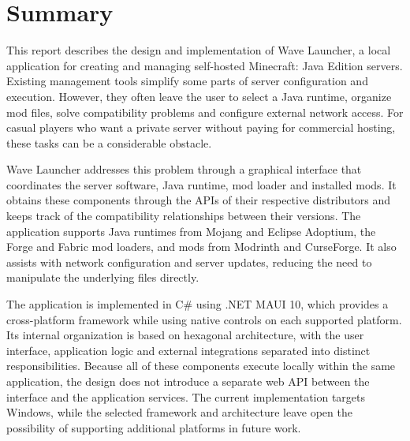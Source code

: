 
\chapter{Summary}

This report describes the design and implementation of Wave Launcher, a local application for creating and managing self-hosted Minecraft: Java Edition servers. Existing management tools simplify some parts of server configuration and execution. However, they often leave the user to select a Java runtime, organize mod files, solve compatibility problems and configure external network access. For casual players who want a private server without paying for commercial hosting, these tasks can be a considerable obstacle.

Wave Launcher addresses this problem through a graphical interface that coordinates the server software, Java runtime, mod loader and installed mods. It obtains these components through the APIs of their respective distributors and keeps track of the compatibility relationships between their versions. The application supports Java runtimes from Mojang and Eclipse Adoptium, the Forge and Fabric mod loaders, and mods from Modrinth and CurseForge. It also assists with network configuration and server updates, reducing the need to manipulate the underlying files directly.

The application is implemented in C\# using .NET MAUI 10, which provides a cross-platform framework while using native controls on each supported platform. Its internal organization is based on hexagonal architecture, with the user interface, application logic and external integrations separated into distinct responsibilities. Because all of these components execute locally within the same application, the design does not introduce a separate web \acs{API} between the interface and the application services. The current implementation targets Windows, while the selected framework and architecture leave open the possibility of supporting additional platforms in future work.
